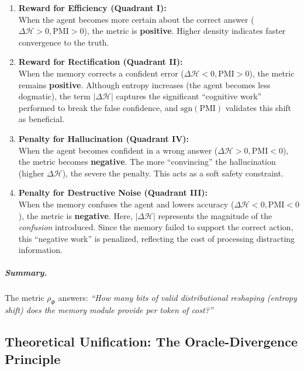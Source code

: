 \begin{enumerate}
    \item \textbf{Reward for Efficiency (Quadrant I):} \\
    When the agent becomes more certain about the correct answer ($\Delta \mathcal{H} > 0, \mathrm{PMI} > 0$), the metric is \textbf{positive}. Higher density indicates faster convergence to the truth.
    
    \item \textbf{Reward for Rectification (Quadrant II):} \\
    When the memory corrects a confident error ($\Delta \mathcal{H} < 0, \mathrm{PMI} > 0$), the metric remains \textbf{positive}. 
    Although entropy increases (the agent becomes less dogmatic), the term $|\Delta \mathcal{H}|$ captures the significant ``cognitive work'' performed to break the false confidence, and $\text{sgn}(\mathrm{PMI})$ validates this shift as beneficial.
    
    \item \textbf{Penalty for Hallucination (Quadrant IV):} \\
    When the agent becomes confident in a wrong answer ($\Delta \mathcal{H} > 0, \mathrm{PMI} < 0$), the metric becomes \textbf{negative}. 
    The more ``convincing'' the hallucination (higher $\Delta \mathcal{H}$), the severe the penalty. This acts as a soft safety constraint.

    \item \textbf{Penalty for Destructive Noise (Quadrant III):} \\
    When the memory confuses the agent and lowers accuracy ($\Delta \mathcal{H} < 0, \mathrm{PMI} < 0$), the metric is \textbf{negative}.
    Here, $|\Delta \mathcal{H}|$ represents the magnitude of the \emph{confusion} introduced. Since the memory failed to support the correct action, this ``negative work'' is penalized, reflecting the cost of processing distracting information.
\end{enumerate}

\subparagraph{Summary.}
The metric $\rho_{\Phi}$ answers: \textit{``How many bits of valid distributional reshaping (entropy shift) does the memory module provide per token of cost?''}

\subsection{Theoretical Unification: The Oracle-Divergence Principle}

